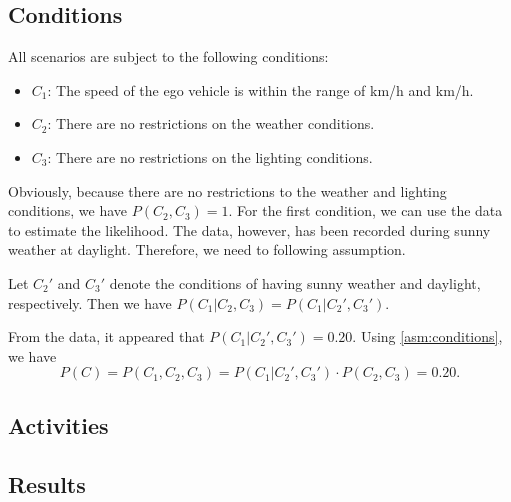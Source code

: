 \subsection{Conditions}
\label{sec:conditions}

All scenarios are subject to the following conditions:
\begin{itemize}
	\item $C_1$: The speed of the ego vehicle is within the range of \unit[60]{km/h} and \unit[130]{km/h}.
	\item $C_2$: There are no restrictions on the weather conditions.
	\item $C_3$: There are no restrictions on the lighting conditions.
\end{itemize}

Obviously, because there are no restrictions to the weather and lighting conditions, we have $P(C_2,C_3)=1$. For the first condition, we can use the data to estimate the likelihood. The data, however, has been recorded during sunny weather at daylight. Therefore, we need to following assumption.

\begin{assumption} \label{asm:conditions}
	Let $C_2'$ and $C_3'$ denote the conditions of having sunny weather and daylight, respectively. Then we have $P(C_1|C_2,C_3)=P(C_1|C_2',C_3')$.
\end{assumption}

From the data, it appeared that $P(C_1|C_2',C_3')=0.20$. Using \cref{asm:conditions}, we have
\begin{dmath}
	P(C) = P(C_1,C_2,C_3)=P(C_1|C_2',C_3')\cdot P(C_2,C_3)=0.20.
\end{dmath}

\subsection{Activities}
\label{sec:activities}

\subsection{Results}
\label{sec:results}

